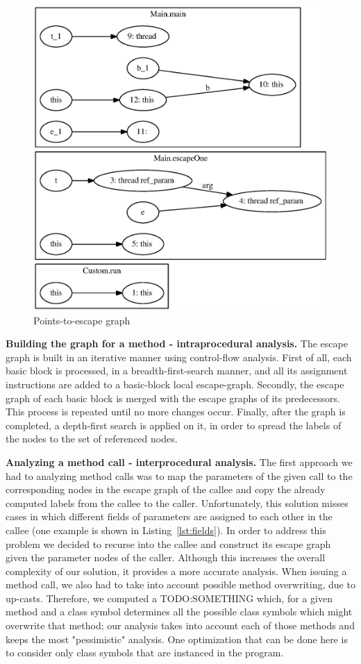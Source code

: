 \documentclass[letterpaper]{article}
\newcommand{\mypar}[1]{{\bf #1.}}
\begin{document}
\begin{figure} \center
 \includegraphics[width=0.8\linewidth]{EscapeTest.eps}
  \caption{Points-to-escape graph}
  \label{fig:escapegraph}
\end{figure}

\mypar{Building the graph for a method - intraprocedural analysis} The escape graph is built in an iterative manner using control-flow analysis.
First of all, each basic block is processed, in a breadth-first-search manner, and all its assignment instructions are added to a
basic-block local escape-graph.
Secondly, the escape graph of each basic block is merged with the escape graphs of its predecessors. This process
is repeated until no more changes occur. Finally, after the graph is completed, a depth-first search is applied on it,
in order to spread the labels of the nodes to the set of referenced nodes.

\mypar{Analyzing a method call - interprocedural analysis} The first approach we had to analyzing method calls was to map the parameters of the given
call to the corresponding nodes in the escape graph of the callee and copy the already computed labels from the callee to the
caller. Unfortunately, this solution misses cases in which different fields of parameters are assigned to each other in the callee
(one example is shown in Listing~\ref{lst:fields}). In order to address this problem we decided to recurse into the callee and
construct its escape graph given the parameter nodes of the caller. Although this increases the overall complexity of our solution,
it provides a more accurate analysis. When issuing a method call, we also had to take into account possible method overwriting, due to up-casts. Therefore, we computed a TODO:SOMETHING which, for a given method and a class symbol
determines all the possible class symbols which might overwrite that method; our analysis takes into account
each of those methods and keeps the most "pessimistic" analysis. One optimization that can be done here is to
consider only class symbols that are instanced in the program.
\end{document}
